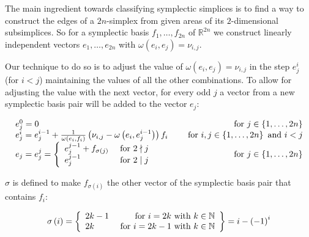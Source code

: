 \documentclass[../SymplecticSimplices.tex]{subfiles}
\begin{document}
The main ingredient towards classifying symplectic simplices is to find a way to construct the edges of a \( 2n \)-simplex from given areas of its \( 2 \)-dimensional subsimplices. So for a symplectic basis \( f_1, \dots, f_{2n} \) of \( \mathbb{R}^{2n} \) we construct linearly independent vectors \( e_1, \dots, e_{2n} \) with \( \omega \left( e_i, e_j \right) = \nu_{i,j} \).

Our technique to do so is to adjust the value of \( \omega \left( e_i, e_j \right) = \nu_{i,j} \) in the step \( e_j^i \) (for \( i < j \)) maintaining the values of all the other combinations. To allow for adjusting the value with the next vector, for every odd \( j \) a vector from a new symplectic basis pair will be added to the vector \( e_j \):

\begin{equation}
  \label{equation:symptobase:vectors}
  \begin{array}{llr}
    e_j^0 = 0 & & \textnormal{ for } j \in \left\lbrace 1, \dots, 2n \right\rbrace \\
    e_j^i = e_j^{i-1} + \frac{1}{\omega\left( e_i, f_i \right)} \left( \nu_{i,j} - \omega \left( e_i, e_j^{i-1} \right) \right) f_i & & \textnormal{ for } i,j \in \left\lbrace 1, \dots, 2n \right\rbrace \textnormal{ and } i < j\\
    e_j = e_j^j = \left\lbrace\begin{array}{lr}
        e_j^{j-1} + f_{\sigma\left(j\right)} & \textnormal{ for } 2 \nmid j \\
        e_j^{j-1} & \textnormal{ for } 2 \mid j
    \end{array}\right. & & \textnormal{ for } j \in \left\lbrace 1, \dots, 2n \right\rbrace
  \end{array}
\end{equation}

\( \sigma \) is defined to make \( f_{\sigma \left( i \right)} \) the other vector of the symplectic basis pair that contains \( f_i \):

\begin{equation*}
 \sigma \left( i \right) = \left\lbrace \begin{array}{lr}
  2k-1 & \textnormal{ for } i = 2k \textnormal{ with } k \in \mathbb{N}\\
  2k & \textnormal{ for } i = 2k-1 \textnormal{ with } k \in \mathbb{N}\\
\end{array} \right\rbrace = i - \left( -1 \right)^{i}
\end{equation*}
\end{document}
